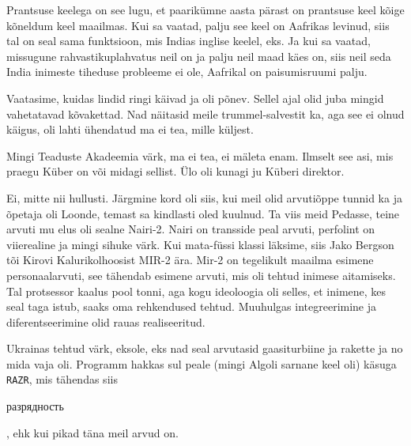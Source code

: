 
Prantsuse keelega on see lugu, et paarikümne aasta pärast on prantsuse keel 
kõige kõneldum keel maailmas. Kui sa vaatad, palju see keel on Aafrikas 
levinud, siis tal on seal sama funktsioon, mis Indias inglise keelel, eks. Ja 
kui sa 
vaatad, missugune  rahvastikuplahvatus neil on ja palju neil maad käes on, siis 
neil seda India inimeste tiheduse probleeme ei ole, Aafrikal on  paisumisruumi 
palju.
                 

Vaatasime, kuidas lindid ringi käivad ja oli põnev. Sellel ajal olid juba 
mingid vahetatavad kõvakettad. Nad näitasid meile trummel-salvestit ka, aga see 
ei olnud käigus, oli lahti ühendatud ma ei tea, mille küljest.


Mingi Teaduste Akadeemia värk, ma ei tea, ei mäleta enam. Ilmselt see asi, mis 
praegu Küber on või midagi sellist. Ülo oli kunagi ju Küberi 
direktor.


Ei, mitte nii hullusti. Järgmine kord oli siis, kui meil olid arvutiõppe tunnid 
ka ja õpetaja oli Loonde, temast sa kindlasti oled 
kuulnud. Ta viis meid Pedasse, 
teine arvuti mu elus oli sealne Nairi-2. Nairi on 
transside peal arvuti, perfolint on viierealine ja mingi sihuke värk. Kui 
mata-füssi klassi läksime, siis Jako Bergson tõi 
Kirovi Kalurikolhoosist MIR-2 
ära. Mir-2 on tegelikult maailma esimene personaalarvuti, see tähendab esimene 
arvuti, mis oli tehtud inimese aitamiseks. Tal protsessor kaalus pool 
tonni, aga kogu ideoloogia oli selles, et inimene, kes seal  taga istub, saaks 
oma rehkendused tehtud. Muuhulgas integreerimine ja diferentseerimine olid 
rauas realiseeritud.

                 
Ukrainas tehtud värk, eksole, eks nad seal arvutasid gaasiturbiine ja 
rakette ja no mida vaja oli. Programm hakkas sul peale (mingi 
Algoli sarnane keel oli) käsuga \verb|RAZR|, mis tähendas siis 
\begin{russian}разрядность\end{russian}, ehk kui pikad täna meil arvud on.

